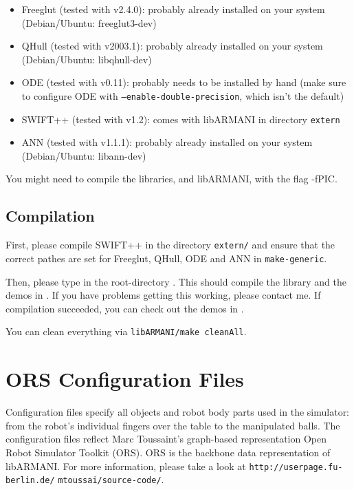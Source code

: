\documentclass[10pt,twoside,twocolumn,fleqn]{article}
\begin{document}
\begin{itemize}
  \item Freeglut (tested with v2.4.0): probably already installed on your
system (Debian/Ubuntu: freeglut3-dev)
  \item QHull (tested with v2003.1): probably already installed on your system
(Debian/Ubuntu: libqhull-dev)
  \item ODE (tested with v0.11): probably needs to be installed by hand (make
sure to configure ODE with \texttt{--enable-double-precision}, which isn't
the default)
  \item SWIFT++ (tested with v1.2): comes with libARMANI in directory
\texttt{extern}
  \item ANN (tested with v1.1.1): probably already installed on your system
(Debian/Ubuntu: libann-dev)
\end{itemize}
You might need to compile the libraries, and libARMANI, with the flag -fPIC.



\subsection{Compilation}

First, please compile SWIFT++ in the directory \texttt{extern/}
and ensure that the correct pathes are set for Freeglut,
QHull, ODE and ANN in \texttt{make-generic}.

Then, please type  in the root-directory
. This should compile the library
 and the demos in . If you have
problems getting this working, please contact me. If compilation
succeeded, you can check out the demos in .

You can clean everything via \texttt{libARMANI/make cleanAll}.




\section{ORS Configuration Files}

Configuration files specify all objects and robot body parts used in the
simulator: from the robot's individual fingers over the table to the
manipulated balls. The configuration files reflect Marc Toussaint's
graph-based representation Open Robot Simulator Toolkit (ORS). ORS is
the backbone data representation of libARMANI. For more information,
please take a look at \texttt{http://userpage.fu-berlin.de/}
\texttt{mtoussai/source-code/}.
\end{document}
